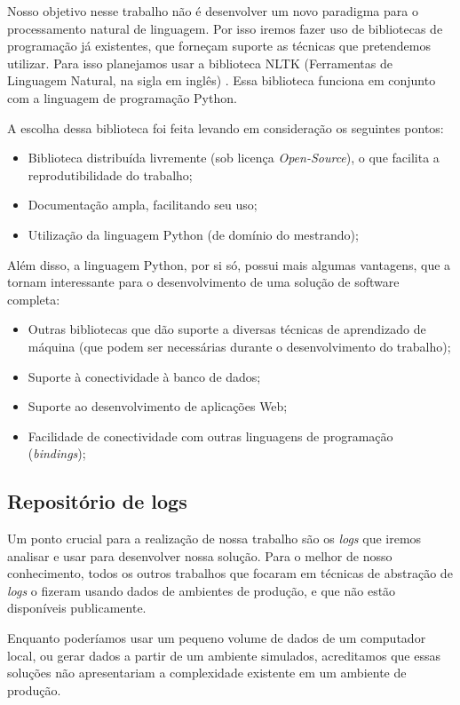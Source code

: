 \documentclass[
	12pt,				%
	openright,			%
	twoside,			%
	a4paper,			%
	english,			%
	spanish,			%
	brazil,				%
	]{abntex2}
\begin{document}
Nosso objetivo nesse trabalho não é desenvolver um novo paradigma para o processamento natural de linguagem. Por isso iremos fazer uso de bibliotecas de programação já existentes, que forneçam suporte as técnicas que pretendemos utilizar. Para isso planejamos usar a biblioteca NLTK (Ferramentas de Linguagem Natural, na sigla em inglês) \cite{bird2009natural}. Essa biblioteca funciona em conjunto com a linguagem de programação Python.

A escolha dessa biblioteca foi feita levando em consideração os seguintes pontos:

\begin{itemize}
	\item Biblioteca distribuída livremente (sob licença \emph{Open-Source}), o que facilita a reprodutibilidade do trabalho;
	\item Documentação ampla, facilitando seu uso;
	\item Utilização da linguagem Python (de domínio do mestrando);
\end{itemize}

Além disso, a linguagem Python, por si só, possui mais algumas vantagens, que a tornam interessante para o desenvolvimento de uma solução de software completa:

\begin{itemize}
	\item Outras bibliotecas que dão suporte a diversas técnicas de aprendizado de máquina (que podem ser necessárias durante o desenvolvimento do trabalho);
	\item Suporte à conectividade à banco de dados;
	\item Suporte ao desenvolvimento de aplicações Web;
	\item Facilidade de conectividade com outras linguagens de programação (\emph{bindings});
\end{itemize}

\subsection{Repositório de logs}

Um ponto crucial para a realização de nossa trabalho são os \emph{logs} que iremos analisar e usar para desenvolver nossa solução. Para o melhor de nosso conhecimento, todos os outros trabalhos que focaram em técnicas de abstração de \emph{logs} o fizeram usando dados de ambientes de produção, e que não estão disponíveis publicamente.

Enquanto poderíamos usar um pequeno volume de dados de um computador local, ou gerar dados a partir de um ambiente simulados, acreditamos que essas soluções não apresentariam a complexidade existente em um ambiente de produção.
\end{document}
